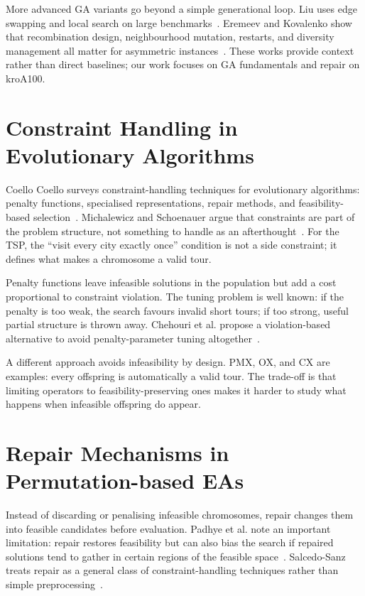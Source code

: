 More advanced GA variants go beyond a simple generational loop. Liu
uses edge swapping and local search on large
benchmarks~\cite{liu2014powerfulga}. Eremeev and Kovalenko show that
recombination design, neighbourhood mutation, restarts, and diversity
management all matter for asymmetric
instances~\cite{eremeev2017optimalrecombination}. These works provide context rather
than direct baselines; our work focuses on GA fundamentals and
repair on kroA100.

\section{Constraint Handling in Evolutionary Algorithms}
\label{Lit:ConstraintHandling}

Coello Coello surveys constraint-handling techniques for evolutionary
algorithms: penalty functions, specialised representations, repair methods,
and feasibility-based selection~\cite{coello2002constraint}. Michalewicz and
Schoenauer argue that constraints are part of the problem structure, not
something to handle as an afterthought~\cite{michalewicz1996evolutionary}. For the TSP,
the ``visit every city exactly once'' condition is not a side constraint; it
defines what makes a chromosome a valid tour.

Penalty functions leave infeasible solutions in the population but add a
cost proportional to constraint violation. The tuning problem is
well known: if the penalty is too weak, the search favours invalid short
tours; if too strong, useful partial structure is thrown away. Chehouri et al. propose a
violation-based alternative to avoid
penalty-parameter tuning altogether~\cite{chehouri2016violationfactor}.

A different approach avoids infeasibility by design. PMX, OX, and CX
are examples: every offspring is automatically a valid tour. The trade-off is
that limiting operators to feasibility-preserving ones makes it harder to
study what happens when infeasible offspring do appear.

\section{Repair Mechanisms in Permutation-based EAs}
\label{Lit:Repair}

Instead of discarding or penalising infeasible chromosomes, repair changes
them into feasible candidates before evaluation. Padhye et al. note an
important limitation: repair restores feasibility but can also bias the
search if repaired solutions tend to gather in certain regions of the
feasible space~\cite{padhye2015feasibilitypreserving}. Salcedo-Sanz treats repair as
a general class of constraint-handling techniques rather than simple
preprocessing~\cite{salcedosanz2009repair}.

